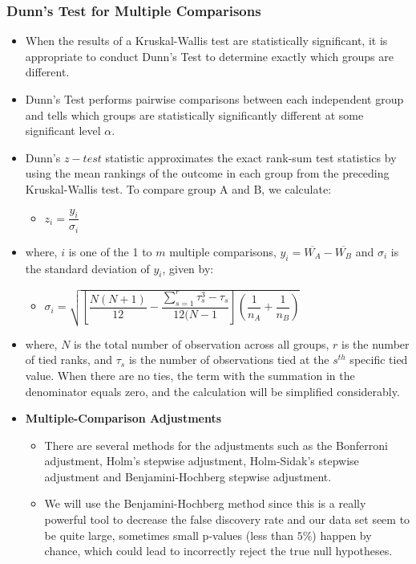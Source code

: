 \documentclass[a4paper]{article}
\begin{document}
\subsubsection{Dunn's Test for Multiple Comparisons}
\begin{itemize}
    \item[] When the results of a Kruskal-Wallis test are statistically significant, it is appropriate to conduct Dunn’s Test to determine exactly which groups are different.
    
    \item[] Dunn’s Test performs pairwise comparisons between each independent group and tells which groups are statistically significantly different at some significant level $\alpha$.
    
    \item[] Dunn's $z-test$ statistic approximates the exact rank-sum test statistics by using the mean rankings of the outcome in each group from the preceding Kruskal-Wallis test. To compare group A and B, we calculate:
    \begin{itemize}
        \centering
        \large
        \item[]  $z_i = \dfrac{y_i}{\sigma_i}$
    \end{itemize}
    
    \item[] where, $i$ is one of the 1 to $m$ multiple comparisons, $y_i = \overline{W_A}-\overline{W_B}$ and $\sigma_i$ is the standard deviation of $y_i$, given by:
    \begin{itemize}
        \large
        \centering
        \item[] $\sigma_i = \sqrt{\left[\dfrac{N(N+1)}{12}-\dfrac{\sum_{s=1}^{r}\tau^3_s-\tau_s}{12(N-1}\right]\left(\dfrac{1}{n_A}+\dfrac{1}{n_B}\right)}$
    \end{itemize}
    \item[] where, $N$ is the total number of observation across all groups, $r$ is the number of tied ranks, and $\tau_s$ is the number of observations tied at the $s^{th}$ specific tied value. When there are no ties, the term with the summation in the denominator equals zero, and the calculation will be simplified considerably.  
    
    
    \item[] \textbf{Multiple-Comparison Adjustments}
    \begin{itemize}
        \item[] There are several methods for the adjustments such as the Bonferroni adjustment, Holm's stepwise adjustment, Holm-Sidak's stepwise adjustment and Benjamini-Hochberg stepwise adjustment.
        
        \item[] We will use the Benjamini-Hochberg method since this is a really powerful tool to decrease the false discovery rate and our data set seem to be quite large, sometimes small p-values (less than $5\%$) happen by chance, which could lead to incorrectly reject the true null hypotheses.
    \end{itemize}
    
\end{itemize}
\end{document}
